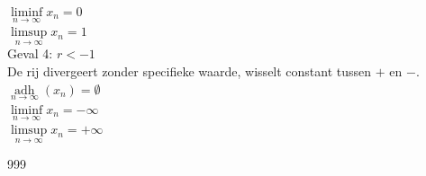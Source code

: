 \documentclass[a4paper]{article}
\begin{document}
$\liminf\limits_{n \to \infty} x_n = 0$ \\

$\limsup\limits_{n \to \infty} x_n = 1$ \\

Geval 4: $r < -1$ \\

De rij divergeert zonder specifieke waarde, wisselt constant tussen $+$ en $-$. \\

$\operatorname*{adh}\limits_{n \to \infty} (x_n) = \emptyset$ \\

$\liminf\limits_{n \to \infty} x_n = -\infty$ \\

$\limsup\limits_{n \to \infty} x_n = +\infty$ \\

\begin{thebibliography}{999}
\end{thebibliography}
\end{document}
